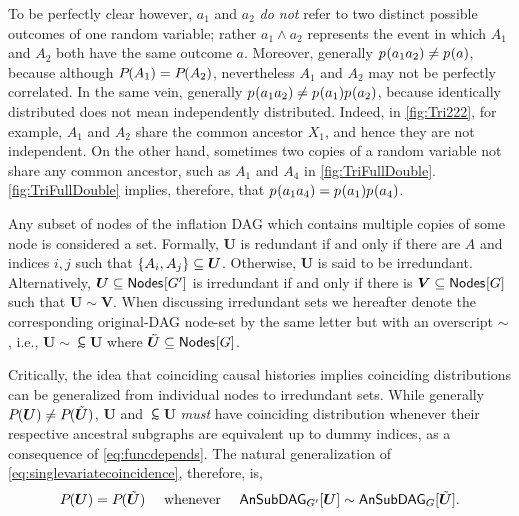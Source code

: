 { 
To be perfectly clear however, $a_1$ and $a_2$ \emph{do not} refer to two distinct possible outcomes of one random variable; rather $a_1\land a_2$  represents the event in which $A_1$ and $A_2$ both have the same outcome $a$. Moreover, generally $\p{a_1 a_2}\neq \p{a}$, because although $\pdf{A_1}=\pdf{A_2}$, nevertheless $A_1$ and $A_2$ may not be perfectly correlated. In the same vein, generally $\p{a_1 a_2}\neq \p{a_1}\p{a_2}$, because identically distributed does not mean independently distributed. Indeed, in \cref{fig:Tri222}, for example, $A_1$ and $A_2$ share the common ancestor $X_1$, and hence they are not independent. On the other hand, sometimes two copies of a random variable not share any common ancestor, such as $A_1$ and $A_4$ in \cref{fig:TriFullDouble}. \cref{fig:TriFullDouble} implies, therefore, that $\p{a_1 a_4}=\p{a_1}\p{a_4}$. 

Any subset of nodes of the inflation DAG which contains multiple copies of some node is considered a  set. Formally, $\bm{U}$ is redundant if and only if there are $A$ and indices $i,j$ such that $\brackets{A_i,A_j}\subseteq\bm{U}$. Otherwise, $\bm{U}$ is said to be irredundant. Alternatively, $\bm{U}\subseteq\nodes{G'}$ is irredundant if and only if there is $\bm{V}\subseteq\nodes{G}$ such that $\bm{U}\sim\bm{V}$. 
When discussing irredundant sets we hereafter denote the corresponding original-DAG node-set by the same letter but with an overscript $\sim$, i.e., $\bm{U}\sim\subsim{\bm{U}}$ where $\subsim{\bm{U}}\subseteq\nodes{G}$. 

Critically, the idea that coinciding causal histories implies coinciding distributions can be generalized from individual nodes to irredundant sets. While generally $\pdf{\bm{U}}\neq\pdf{\subsim{\bm{U}}}$,  $\bm{U}$ and $\subsim{\bm{U}}$ \emph{must} have coinciding distribution whenever their respective ancestral subgraphs are equivalent up to dummy indices, as a consequence of  \cref{eq:funcdepends}.
The natural generalization of \cref{eq:singlevariatecoincidence}, therefore, is,
\begin{align}
\pdf{\bm{U}}=\pdf{\subsim{\bm{U}}} \quad\text{ whenever }\quad\ansubgraph[G']{\bm{U}}\sim\ansubgraph[G]{\subsim{\bm{U}}}.
\end{align}

}
